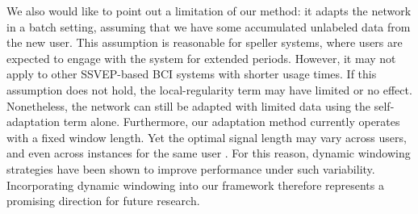\documentclass[12pt]{iopart}
\begin{document}
We also would like to point out a limitation of our method: it adapts the network in a batch setting, assuming that we have some accumulated unlabeled data from the new user. This assumption is reasonable for speller systems, where users are expected to engage with the system for extended periods. However, it may not apply to other SSVEP-based BCI systems with shorter usage times. If this assumption does not hold, the local-regularity term may have limited or no effect. Nonetheless, the network can still be adapted with limited data using the self-adaptation term alone. {Furthermore, our adaptation method currently operates with a fixed window length. Yet the optimal signal length may vary across users, and even across instances for the same user \cite{dynamic_window_reason}. For this reason, dynamic windowing strategies \cite{dynamic_window1,dynamic_window2,dynamic_window3} have been shown to improve performance under such variability. Incorporating dynamic windowing into our framework therefore represents a promising direction for future research.}
\end{document}
